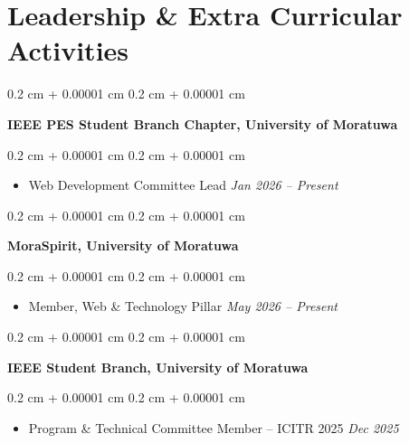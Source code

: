 \documentclass[10pt, letterpaper]{article}
\newenvironment{highlights}{
	\vspace{0.05 cm}
	\begin{itemize}[
		topsep=0.10 cm,
		parsep=0.10 cm,
		partopsep=0pt,
		itemsep=0pt,
		leftmargin=0.4 cm + 10pt
	]
	}{
	\end{itemize}
} %
\newenvironment{onecolentry}{
	\begin{adjustwidth}{
		0.2 cm + 0.00001 cm
	}{
		0.2 cm + 0.00001 cm
	}
	}{
	\end{adjustwidth}
} %
\begin{document}
	\section{Leadership \& Extra Curricular Activities}
	\begin{onecolentry}
		\textbf{IEEE PES Student Branch Chapter, University of Moratuwa}
	\end{onecolentry}
	\begin{onecolentry}
		\begin{highlights}
			\item Web Development Committee Lead \hfill \textit{Jan 2026 -- Present}
		\end{highlights}
	\end{onecolentry}
	\vspace{0.12 cm}
	\begin{onecolentry}
		\textbf{MoraSpirit, University of Moratuwa}
	\end{onecolentry}
	\begin{onecolentry}
		\begin{highlights}
			\item Member, Web \& Technology Pillar \hfill \textit{May 2026 -- Present}
		\end{highlights}
	\end{onecolentry}
	\vspace{0.12 cm}
	\begin{onecolentry}
		\textbf{IEEE Student Branch, University of Moratuwa}
	\end{onecolentry}
	\begin{onecolentry}
		\begin{highlights}
			\item Program \& Technical Committee Member -- ICITR 2025 \hfill \textit{Dec 2025}
		\end{highlights}
	\end{onecolentry}

\end{document}
